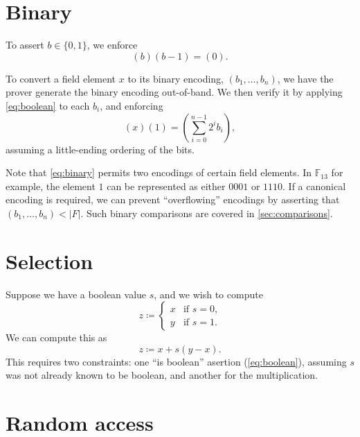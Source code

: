 \documentclass{article}
\begin{document}
\section{Binary}

To assert $b \in \{ 0, 1 \}$, we enforce
\begin{equation} \label{eq:boolean}
  (b) (b - 1) = (0).
\end{equation}

To convert a field element $x$ to its binary encoding, $(b_1, \dots, b_n)$, we have the prover generate the binary encoding out-of-band. We then verify it by applying \autoref{eq:boolean} to each $b_i$, and enforcing
\begin{equation} \label{eq:binary}
  (x) (1) = \left( \sum_{i=0}^{n-1} 2^i b_i \right),
\end{equation}
assuming a little-ending ordering of the bits.

Note that \autoref{eq:binary} permits two encodings of certain field elements. In $\mathbb{F}_{13}$ for example, the element $1$ can be represented as either $0001$ or $1110$. If a canonical encoding is required, we can prevent ``overflowing'' encodings by asserting that $(b_1, \dots, b_n) < |F|$. Such binary comparisons are covered in \autoref{sec:comparisons}.


\section{Selection} \label{sec:selection}

Suppose we have a boolean value $s$, and we wish to compute
\begin{equation}
  z \coloneqq
  \begin{cases}
    x & \text{if $s = 0$,} \\
    y & \text{if $s = 1$.}
  \end{cases}
\end{equation}
We can compute this as
\begin{equation} \label{eq:selection}
  z \coloneqq x + s(y - x).
\end{equation}
This requires two constraints: one ``is boolean'' asertion (\autoref{eq:boolean}), assuming $s$ was not already known to be boolean, and another for the multiplication.


\section{Random access}
\end{document}
